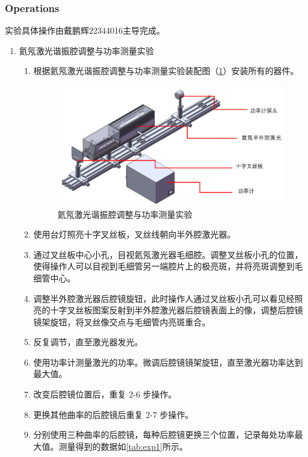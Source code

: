 \subsubsection{Operations}
实验具体操作由戴鹏辉22344016主导完成。
\begin{enumerate}
	\item 氦氖激光谐振腔调整与功率测量实验
	\begin{enumerate}
		\item 根据氦氖激光谐振腔调整与功率测量实验装配图（\cref{fig:apl18exp1}）安装所有的器件。
		
		\begin{figure}[h!]
			\centering
			\includegraphics[width=0.5\linewidth]{images/APL1_8_Exp1}
			\caption{氦氖激光谐振腔调整与功率测量实验}
			\label{fig:apl18exp1}
		\end{figure}
		
		\item 使用台灯照亮十字叉丝板，叉丝线朝向半外腔激光器。
		
		\item 通过叉丝板中心小孔，目视氦氖激光器毛细腔。调整叉丝板小孔的位置，使得操作人可以目视到毛细管另一端腔片上的极亮斑，并将亮斑调整到毛细管中心。
		
		\item 调整半外腔激光器后腔镜旋钮，此时操作人通过叉丝板小孔可以看见经照亮的十字叉丝板图案反射到半外腔激光器后腔镜表面上的像，调整后腔镜镜架旋钮，将叉丝像交点与毛细管内亮斑重合。
		
		\item 反复调节，直至激光器发光。
		
		\item 使用功率计测量激光的功率。微调后腔镜镜架旋钮，直至激光器功率达到最大值。
		
		\item 改变后腔镜位置后，重复 2-6 步操作。
		
		\item 更换其他曲率的后腔镜后重复 2-7 步操作。
		
		\item 分别使用三种曲率的后腔镜，每种后腔镜更换三个位置，记录每处功率最大值。测量得到的数据如\cref{tab:exp1}所示。
	\end{enumerate}
	

\end{enumerate}

